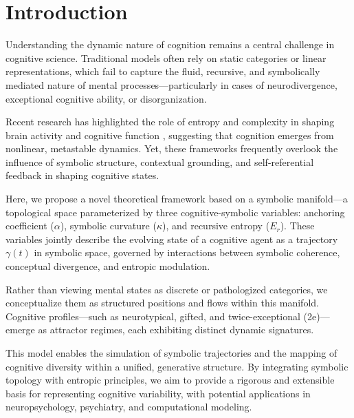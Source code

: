 \section*{Introduction}

Understanding the dynamic nature of cognition remains a central challenge in cognitive science. Traditional models often rely on static categories or linear representations, which fail to capture the fluid, recursive, and symbolically mediated nature of mental processes—particularly in cases of neurodivergence, exceptional cognitive ability, or disorganization.

Recent research has highlighted the role of entropy and complexity in shaping brain activity and cognitive function \cite{carhart2014entropic, bassett2017network}, suggesting that cognition emerges from nonlinear, metastable dynamics. Yet, these frameworks frequently overlook the influence of symbolic structure, contextual grounding, and self-referential feedback in shaping cognitive states.

Here, we propose a novel theoretical framework based on a symbolic manifold—a topological space parameterized by three cognitive-symbolic variables: anchoring coefficient ($\alpha$), symbolic curvature ($\kappa$), and recursive entropy ($E_r$). These variables jointly describe the evolving state of a cognitive agent as a trajectory $\gamma(t)$ in symbolic space, governed by interactions between symbolic coherence, conceptual divergence, and entropic modulation.

Rather than viewing mental states as discrete or pathologized categories, we conceptualize them as structured positions and flows within this manifold. Cognitive profiles—such as neurotypical, gifted, and twice-exceptional (2e)—emerge as attractor regimes, each exhibiting distinct dynamic signatures.

This model enables the simulation of symbolic trajectories and the mapping of cognitive diversity within a unified, generative structure. By integrating symbolic topology with entropic principles, we aim to provide a rigorous and extensible basis for representing cognitive variability, with potential applications in neuropsychology, psychiatry, and computational modeling.